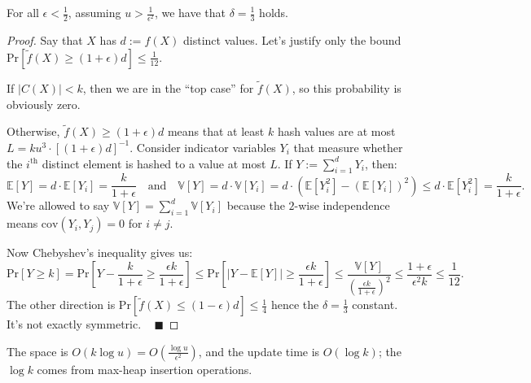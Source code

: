 \begin{claim}
    For all $\epsilon < \frac{1}{2}$, assuming $u > \frac{1}{\epsilon^2}$, we have that $\delta = \frac{1}{3}$ holds.
\end{claim}

\begin{proof}
    Say that $X$ has $d := f(X)$ distinct values.  Let's justify only the bound $\mathrm{Pr}\left [\tilde{f}(X) \geq (1 + \epsilon) d\right ] \leq \frac{1}{12}$.

    If $|C(X)| < k$, then we are in the ``top case'' for $\tilde{f}(X)$, so this probability is obviously zero.

    Otherwise, $\tilde{f}(X) \geq (1 + \epsilon) d$ means that at least $k$ hash values are at most $L = k u^3 \cdot \left [ (1 + \epsilon) d \right ]^{-1}$.  Consider indicator variables $Y_i$ that measure whether the $i^{\text{th}}$ distinct element is hashed to a value at most $L$.  If $Y := \sum_{i = 1}^d Y_i$, then:
    \[ \mathbb{E}[Y] = d \cdot \mathbb{E}[Y_i] = \dfrac{k}{1 + \epsilon} ~~~ \text{ and } ~~~ \mathbb{V}[Y] = d \cdot \mathbb{V}[Y_i] = d \cdot\left(\mathbb{E}[Y_i^2] - (\mathbb{E}[Y_i])^2\right) \leq d \cdot \mathbb{E}[Y_i^2] = \dfrac{k}{1 + \epsilon}. \]
    We're allowed to say $\mathbb{V}[Y] = \sum_{i = 1}^d \mathbb{V}[Y_i]$ because the $2$-wise independence means $\mathrm{cov}(Y_i, Y_j) = 0$ for $i \neq j$.

    Now Chebyshev's inequality gives us:
    \[ \mathrm{Pr}[Y \geq k] = \mathrm{Pr}\left [ Y - \dfrac{k}{1 + \epsilon} \geq \dfrac{\epsilon k}{1 + \epsilon} \right ] \leq \mathrm{Pr} \left [ |Y - \mathbb{E}[Y]| \geq \dfrac{\epsilon k}{1 + \epsilon} \right] \leq \dfrac{\mathbb{V}[Y]}{\left(\frac{\epsilon k}{1 + \epsilon}\right)^2}  \leq \dfrac{1 + \epsilon}{\epsilon^2k} \leq \dfrac{1}{12}. \]
    The other direction is $\mathrm{Pr}\left [\tilde{f}(X) \leq (1 - \epsilon) d\right ] \leq \frac{1}{4}$ hence the $\delta = \frac{1}{3}$ constant.  It's not exactly symmetric. ~ $\blacksquare$
\end{proof}

The space is $O(k \log u) = O\left(\frac{\log u}{\epsilon^2}\right)$, and the update time is $O(\log k)$; the $\log k$ comes from max-heap insertion operations.

